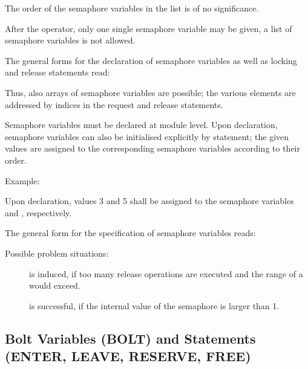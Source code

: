 The order of the semaphore variables in the list is of no significance.

After the  operator, only one single semaphore variable may be
given, a list of semaphore variables is not allowed.

The general forms for the declaration of semaphore variables as well as
locking and release statements read:

\begin{grammarframe}



\end{grammarframe}


Thus, also arrays of semaphore variables are possible; the various
elements are addressed by indices in the request and release
statements.

Semaphore variables must be declared at module level. Upon declaration,
semaphore variables can also be initialised explicitly by 
statement; the given values are assigned to the corresponding
semaphore variables according to their order.

Example:

Upon declaration, values 3 and 5 shall be assigned to the semaphore
variables  and , respectively.


The general form for the specification of semaphore variables reads:

\begin{grammarframe}

\end{grammarframe}

Possible problem situations:

\begin{description}
\item[] is induced, if too many release operations
   are executed and the range of a  would exceed.
\item[ ] is successful, if the internal value of the 
   semaphore is larger than 1.

\end{description}

\subsection{Bolt Variables (BOLT) and Statements (ENTER, LEAVE,
RESERVE, FREE)} %
\label{sec_bolt}

